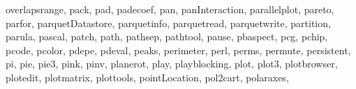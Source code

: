 {{        overlapsrange,%
        pack,%
        pad,%
        padecoef,%
        pan,%
        panInteraction,%
        parallelplot,%
        pareto,%
        parfor,%
        parquetDatastore,%
        parquetinfo,%
        parquetread,%
        parquetwrite,%
        partition,%
        parula,%
        pascal,%
        patch,%
        path,%
        pathsep,%
        pathtool,%
        pause,%
        pbaspect,%
        pcg,%
        pchip,%
        pcode,%
        pcolor,%
        pdepe,%
        pdeval,%
        peaks,%
        perimeter,%
        perl,%
        perms,%
        permute,%
        persistent,%
        pi,%
        pie,%
        pie3,%
        pink,%
        pinv,%
        planerot,%
        play,%
        playblocking,%
        plot,%
        plot3,%
        plotbrowser,%
        plotedit,%
        plotmatrix,%
        plottools,%
        pointLocation,%
        pol2cart,%
        polaraxes,%
}}
